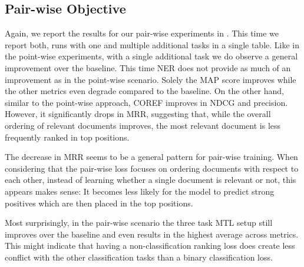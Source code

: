 \subsection{Pair-wise Objective}
Again, we report the results for our pair-wise experiments in . This time we report both, runs with one and multiple additional tasks in a single table. Like in the point-wise experiments, with a single additional task we do observe a general improvement over the baseline. This time NER does not provide as much of an improvement as in the point-wise scenario. Solely the MAP score improves while the other metrics even degrade compared to the baseline. On the other hand, similar to the point-wise approach, COREF improves in NDCG and precision. However, it significantly drops in MRR, suggesting that, while the overall ordering of relevant documents improves, the most relevant document is less frequently ranked in top positions.

The decrease in MRR seems to be a general pattern for pair-wise training. When considering that the pair-wise loss focuses on ordering documents with respect to each other, instead of learning whether a single document is relevant or not, this appears makes sense: It becomes less likely for the model to predict strong positives which are then placed in the top positions.

Most surprisingly, in the pair-wise scenario the three task MTL setup still improves over the baseline and even results in the highest average across metrics. This might indicate that having a non-classification ranking loss does create less conflict with the other classification tasks than a binary classification loss.

